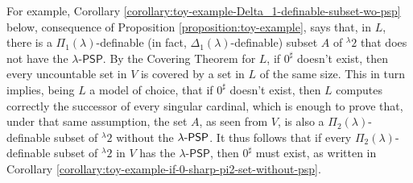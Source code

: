 \documentclass{amsart}
\numberwithin{equation}{section}
\def\hyp{{\hbox{-}}}
\theoremstyle{definition}
\theoremstyle{remark}
\begin{document}
For example, Corollary \ref{corollary:toy-example-Delta_1-definable-subset-wo-psp} below, consequence of Proposition \ref{proposition:toy-example}, says that, in $L$, there is a $\Pi_{1}(\lambda)$-definable (in fact, $\Delta_1(\lambda)$-definable) subset $A$ of ${}^{\lambda}2$ that does not have the $\lambda$-$\mathsf{PSP}$. By the Covering Theorem for $L$, if $0^{\sharp}$ doesn't exist, then every uncountable set in $V$ is covered by a set in $L$ of the same size. This in turn implies, being $L$ a model of choice, that if $0^{\sharp}$ doesn't exist, then $L$ computes correctly the successor of every singular cardinal, which is enough to prove that, under that same assumption, the set $A$, as seen from $V$, is also a $\Pi_2(\lambda)$-definable subset of ${}^{\lambda}2$ without the $\lambda\hyp\mathsf{PSP}$. It thus follows that if every $\Pi_{2}(\lambda)$-definable subset of $^{\lambda}2$ in $V$ has the $\lambda$-$\mathsf{PSP}$, then $0^{\sharp}$ must exist, as written in Corollary \ref{corollary:toy-example-if-0-sharp-pi2-set-without-psp}. 
\end{document}
